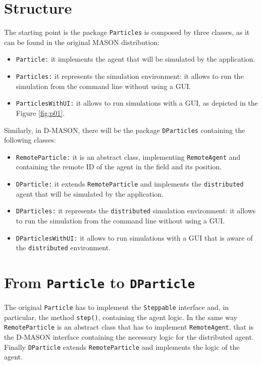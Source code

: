\documentclass{article}
\begin{document}
\section{Structure}
The starting point is the package \texttt{Particles} is composed by three classes, as it can be found in the original MASON distribution:

\begin{itemize}
	\item \texttt{Particle:} it implements the agent that will be simulated by the application.
	\item \texttt{Particles:} it represents the simulation environment: it allows to run the simulation from the command line without using a GUI.
	\item \texttt{ParticlesWithUI:} it allows to run simulations with a GUI, as depicted in the Figure \ref{fig:p01}.
\end{itemize}

Similarly, in D-MASON, there will be the package \texttt{DParticles} containing the following classes:
\begin{itemize}
	\item \texttt{RemoteParticle:} it is an abstract class, implementing \texttt{RemoteAgent} and containing the remote ID of the agent in the field and its position. 
	\item \texttt{DParticle:} it extends \texttt{RemoteParticle} and implements the \texttt{distributed} agent that will be simulated by the application.
	\item \texttt{DParticles:} it represents the \texttt{distributed} simulation environment: it allows to run the simulation from the command line without using a GUI.
	\item \texttt{DParticlesWithUI:} it allows to run simulations with a GUI that is aware of the \texttt{distributed} environment.
\end{itemize}

\section{From \texttt{Particle} to \texttt{DParticle}}
The original \texttt{Particle} has to implement the \texttt{Steppable} interface and, in particular, the method \texttt{step()}, containing the agent logic. In the same way \texttt{RemoteParticle} is an abstract class that has to implement \texttt{RemoteAgent}, that is the D-MASON interface containing the necessary logic for the distributed agent. Finally \texttt{DParticle} extends \texttt{RemoteParticle} and implements the logic of the agent.
\end{document}
